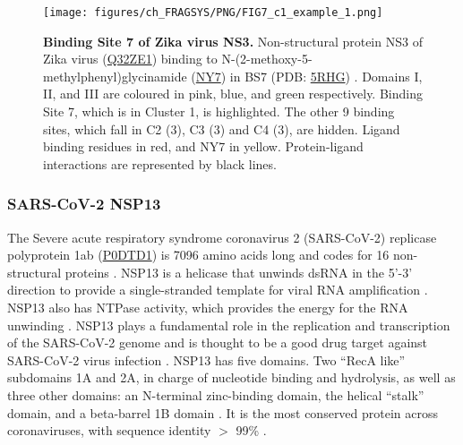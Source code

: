 \begin{figure}[htb!]
    \centering
    \texttt{[image: figures/ch\_FRAGSYS/PNG/FIG7\_c1\_example\_1.png]}
    \caption[Binding Site 7 of Zika virus NS3]{\textbf{Binding Site 7 of Zika virus NS3.} Non-structural protein NS3 of Zika virus (\href{https://www.uniprot.org/uniprotkb/Q32ZE1/entry}{Q32ZE1}) binding to N-(2-methoxy-5-methylphenyl)glycinamide (\href{https://www.ebi.ac.uk/pdbe-srv/pdbechem/chemicalCompound/show/NY7}{NY7}) in BS7 (PDB: \href{https://www.ebi.ac.uk/pdbe/entry/pdb/5RHG}{5RHG}) \cite{PDB_5RHG}. Domains I, II, and III are coloured in pink, blue, and green respectively. Binding Site 7, which is in Cluster 1, is highlighted. The other 9 binding sites, which fall in C2 (3), C3 (3) and C4 (3), are hidden. Ligand binding residues in red, and NY7 in yellow. Protein-ligand interactions are represented by black lines.}
    \label{fig:c1_example_1}
\end{figure}

\subsubsection{SARS-CoV-2 NSP13}

The Severe acute respiratory syndrome coronavirus 2 (SARS-CoV-2) replicase polyprotein 1ab (\href{https://www.uniprot.org/uniprotkb/P0DTD1/entry}{P0DTD1}) is 7096 amino acids long and codes for 16 non-structural proteins \cite{NAQVI_2020_SARSCOV2}. NSP13 is a helicase that unwinds dsRNA in the 5’-3’ direction to provide a single-stranded template for viral RNA amplification \cite{YUE_2022_SARSCOV2}. NSP13 also has NTPase activity, which provides the energy for the RNA unwinding \cite{SHU_2020_SARSCOV2}. NSP13 plays a fundamental role in the replication and transcription of the SARS-CoV-2 genome and is thought to be a good drug target against SARS-CoV-2 virus infection \cite{ZENG_2021_SARSCOV2}. NSP13 has five domains. Two ``RecA like'' subdomains 1A and 2A, in charge of nucleotide binding and hydrolysis, as well as three other domains: an N-terminal zinc-binding domain, the helical ``stalk'' domain, and a beta-barrel 1B domain \cite{ROMEO_2022_SARSCOV2}. It is the most conserved protein across coronaviruses, with sequence identity $>$ 99\% \cite{RICCI_2022_SARSCOV2}.

